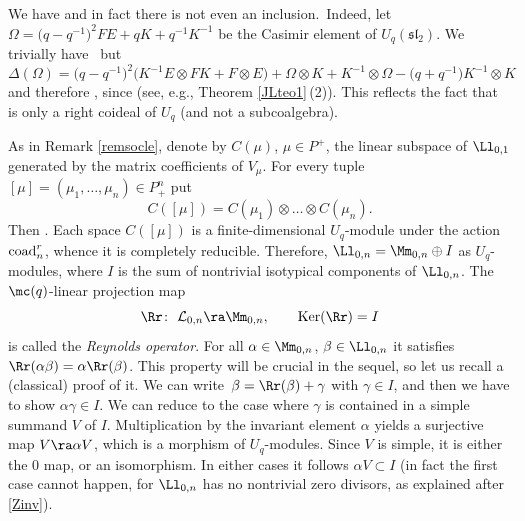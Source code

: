 \begin{Remark}We have  and in fact there is not even an inclusion.~Indeed, let $\Omega=\big(q-q^{-1}\big)^2FE+qK+q^{-1}K^{-1}$ be the Casimir element of $U_q({\mathfrak{sl}_2})$. We trivially have~ but
\[\Delta(\Omega)=\big(q-q^{-1}\big)^2\big(K^{-1}E\otimes FK+F\otimes E\big)+
\Omega\otimes K+ K^{-1}\otimes \Omega-\big(q+q^{-1}\big)K^{-1}\otimes K\]
and therefore , since  (see, e.g., Theorem \ref{JLteo1}\,(2)). This reflects the fact that  is only a right coideal of $U_q$ (and not a subcoalgebra).
\end{Remark}
As in Remark \ref{remsocle}, denote by $C(\mu)$, $\mu\in P^+$, the linear subspace of $\Ll_{0,1}$ generated by the matrix coefficients of $V_\mu$. For every tuple $[\mu] = (\mu_1,\dots,\mu_n)\in P_+^n$ put
\begin{equation}\label{defCmu}
C([\mu]) =C(\mu_1)\otimes \dots \otimes C(\mu_n).
\end{equation}
Then . Each space $C({[\mu]})$ is a finite-dimensional $U_q$-module under the action ${\rm coad}^r_n$, whence it is completely reducible. Therefore, $
\Ll_{0,n} = \Mm_{0,n} \oplus I$ as $U_q$-modules, where $I$ is the sum of nontrivial isotypical components of $\Ll_{0,n}$. The $\mc(q)$-linear projection map
\begin{equation}\label{Reynoldsdef}
\Rr\colon\ {\mathcal L}_{0,n}\ra \Mm_{0,n}, \qquad {\rm Ker}(\Rr)=I
\end{equation}
is called the {\it Reynolds operator}. For all $\alpha\in \Mm_{0,n}$, $\beta \in \Ll_{0,n}$ it satisfies $
\Rr(\alpha \beta) = \alpha \Rr(\beta)$.
This property will be crucial in the sequel, so let us recall a (classical) proof of it. We can write~${\beta = \Rr(\beta) + \gamma}$ with $\gamma \in I$, and then we have to show $\alpha \gamma \in I$. We can reduce to the case where $\gamma$ is contained in a simple summand $V$ of $I$. Multiplication by the invariant element $\alpha$ yields a surjective map $V \ra \alpha V$, which is a morphism of $U_q$-modules. Since $V$ is simple, it is either the $0$ map, or an isomorphism. In either cases it follows $\alpha V \subset I$ (in fact the first case cannot happen, for $\Ll_{0,n}$ has no nontrivial zero divisors, as explained after \eqref{Zinv}).

